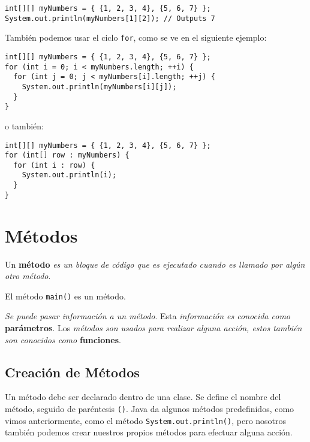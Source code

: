 \documentclass[12pt]{article}
\theoremstyle{largebreak}
\begin{document}
    \begin{lstlisting}[caption={Acceder Elementos de Arreglo Bidimensional.},label=DescriptiveLabel]
int[][] myNumbers = { {1, 2, 3, 4}, {5, 6, 7} };
System.out.println(myNumbers[1][2]); // Outputs 7
    \end{lstlisting}

    \begin{obs}
        También podemos usar el ciclo \lstinline|for|, como se ve en el siguiente ejemplo:
        \begin{lstlisting}[caption={Ciclo \lstinline|for| en Arreglo Bidimensional.},label=DescriptiveLabel]
int[][] myNumbers = { {1, 2, 3, 4}, {5, 6, 7} };
for (int i = 0; i < myNumbers.length; ++i) {
  for (int j = 0; j < myNumbers[i].length; ++j) {
    System.out.println(myNumbers[i][j]);
  }
}
        \end{lstlisting}
        o también:
        \begin{lstlisting}[caption={Ciclo \lstinline|for-each| en Arreglo Bidimensional.},label=DescriptiveLabel]
int[][] myNumbers = { {1, 2, 3, 4}, {5, 6, 7} };
for (int[] row : myNumbers) {
  for (int i : row) {
    System.out.println(i);
  }
}
        \end{lstlisting}
    \end{obs}

    \section{Métodos}

    \begin{mydef}
        Un \textbf{método} \textit{es un bloque de código que es ejecutado cuando es llamado por algún otro método}.
    \end{mydef}

    \begin{obs}
        El método \lstinline|main()| es un método.
    \end{obs}

    \textit{Se puede pasar información a un método}. Esta \textit{información es conocida como} \textbf{parámetros}. Los \textit{métodos son usados para realizar alguna acción, estos también son conocidos como} \textbf{funciones}.

    \subsection{Creación de Métodos}
    
    Un método debe ser declarado dentro de una clase. Se define el nombre del método, seguido de paréntesis \lstinline|()|. Java da algunos métodos predefinidos, como vimos anteriormente, como el método \lstinline|System.out.println()|, pero nosotros también podemos crear nuestros propios métodos para efectuar alguna acción.
\end{document}
